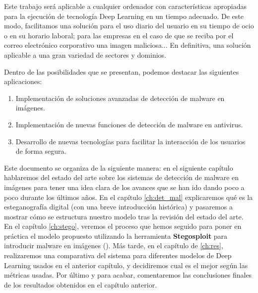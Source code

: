 Este trabajo será aplicable a cualquier ordenador con características apropiadas para la ejecución de tecnología Deep Learning en un tiempo adecuado. De este modo, facilitamos una solución para el uso diario del usuario en su tiempo de ocio o en su horario laboral; para las empresas en el caso de que se reciba por el correo electrónico corporativo una imagen maliciosa... En definitiva, una solución aplicable a una gran variedad de sectores y dominios. 

Dentro de las posibilidades que se presentan, podemos destacar las siguientes aplicaciones:
\begin{enumerate}
\item Implementación de soluciones avanzadas de detección de malware en imágenes.
\item Implementación de nuevas funciones de detección de malware en antivirus.
\item Desarrollo de nuevas tecnologías para facilitar la interacción de los usuarios de forma segura.
\end{enumerate}

Este documento se organiza de la siguiente manera: en el siguiente capítulo hablaremos del estado del arte sobre los sistemas de detección de malware en imágenes para tener una idea clara de los avances que se han ido dando poco a poco durante los últimos años. En el capítulo \ref{ch:det_mal} explicaremos qué es la esteganografía digital (con una breve introducción histórica) y pasaremos a mostrar cómo se estructura nuestro modelo tras la revisión del estado del arte. En el capítulo \ref{ch:stego}, veremos el proceso que hemos seguido para poner en práctica el modelo propuesto utilizando la herramienta \textbf{Stegosploit} para introducir malware en imágenes (\cite{stegosploit}). Más tarde, en el capítulo de \ref{ch:res}, realizaremos una comparativa del sistema para diferentes modelos de Deep Learning usados en el anterior capítulo, y decidiremos cual es el mejor según las métricas usadas. Por último y para acabar, comentaremos las conclusiones finales de los resultados obtenidos en el capítulo anterior. %